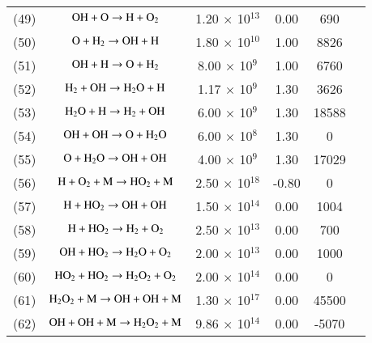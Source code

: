 \documentclass{warpdoc}
\begin{document}
\begin{table}[h]
\begin{center}
\begin{threeparttable}
\begin{tabular}{cccccc}
(49) & $\rm OH + O \rightarrow H +O_2 $ &1.20 $\times$ 10$^{13}$  & 0.00 &690&\cite{rkm:1991:smoke}\\

(50) & $\rm O + H_2 \rightarrow OH+H $ &1.80 $\times$ 10$^{10}$  & 1.00 &8826&\cite{rkm:1991:smoke}\\

(51) & $\rm OH +H \rightarrow O + H_2 $ &8.00 $\times$ 10$^{9}$  & 1.00 &6760&\cite{rkm:1991:smoke}\\

(52) & $\rm H_2 + OH \rightarrow H_2 O + H  $ &1.17 $\times$ 10$^{9}$  & 1.30 &3626&\cite{rkm:1991:smoke}\\

(53) & $\rm H_2 O + H \rightarrow H_2 +OH  $ &6.00 $\times$ 10$^{9}$  & 1.30 &18588&\cite{rkm:1991:smoke}\\

(54) & $\rm OH+OH \rightarrow O + H_2 O  $ &6.00 $\times$ 10$^{8}$  & 1.30 &0&\cite{rkm:1991:smoke}\\

(55) & $\rm O + H_2 O \rightarrow OH + OH  $ &4.00 $\times$ 10$^{9}$  & 1.30 &17029&\cite{rkm:1991:smoke}\\

(56) & $\rm H + O_2 + M \rightarrow H O_2 + M $ &2.50 $\times$ 10$^{18}$  & -0.80 &0&\cite{rkm:1991:smoke}\\

(57) & $\rm H + H O_2  \rightarrow OH + OH $ &1.50 $\times$ 10$^{14}$  & 0.00 &1004&\cite{rkm:1991:smoke}\\

(58) & $\rm H + H O_2  \rightarrow H_2 + O_2 $ &2.50 $\times$ 10$^{13}$  &0.00 &700&\cite{rkm:1991:smoke}\\

(59) & $\rm OH + H O_2  \rightarrow H_2 O + O_2 $ &2.00 $\times$ 10$^{13}$  &0.00 &1000&\cite{rkm:1991:smoke}\\

(60) & $\rm H O_2 + H O_2  \rightarrow H_2 O_2 + O_2 $ &2.00 $\times$ 10$^{14}$  &0.00 &0&\cite{rkm:1991:smoke}\\

(61) & $\rm H_2 O_2 + M  \rightarrow OH+OH+M $ &1.30 $\times$ 10$^{17}$  &0.00 &45500&\cite{rkm:1991:smoke}\\

(62) & $\rm OH+OH+M  \rightarrow H_2 O_2 + M $ &9.86 $\times$ 10$^{14}$  &0.00 &-5070&\cite{rkm:1991:smoke}\\


\end{tabular}
\end{threeparttable}
\end{center}
\end{table}
\end{document}
